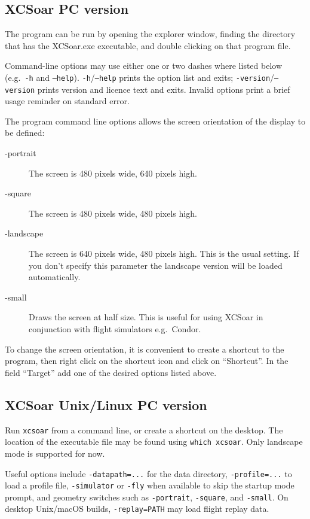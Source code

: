 \subsection*{XCSoar PC version}
The program can be run by opening the explorer window, finding the directory
that has the XCSoar.exe executable, and double clicking on that program file.

Command-line options may use either one or two dashes where listed below (e.g.\
\texttt{-h} and \texttt{--help}).
\texttt{-h}/\texttt{--help} prints the option list and exits;
\texttt{-version}/\texttt{--version} prints version and licence text and exits.
Invalid options print a brief usage reminder on standard error.

The program command line options allows the screen orientation of
the display to be defined:
\begin{description}
\item[-portrait] The screen is 480 pixels wide, 640 pixels high.
\item[-square] The screen is 480 pixels wide, 480 pixels high.
\item[-landscape] The screen is 640 pixels wide, 480 pixels high. This is the
usual setting. If you don't specify this parameter the landscape version will be
loaded automatically.
\item[-small] Draws the screen at half size.  This is useful for using XCSoar in
 conjunction with flight simulators e.g.\ Condor.
\end{description}
To change the screen orientation, it is convenient to create a shortcut to the
program, then right click on the shortcut icon and click on ``Shortcut''. 
In the field ``Target'' add one of the desired options listed above.

\subsection*{XCSoar Unix/Linux PC version}
Run \verb|xcsoar| from a command line, or create a shortcut on the
desktop.  The location of the executable file may be found using
\verb|which xcsoar|.  Only landscape mode is  supported for now.

Useful options include \verb|-datapath=...| for the data directory,
\verb|-profile=...| to load a profile file, \verb|-simulator| or \verb|-fly|
when available to skip the startup mode prompt, and geometry switches such as
\verb|-portrait|, \verb|-square|, and \verb|-small|.
On desktop Unix/macOS builds, \verb|-replay=PATH| may load flight replay data.

